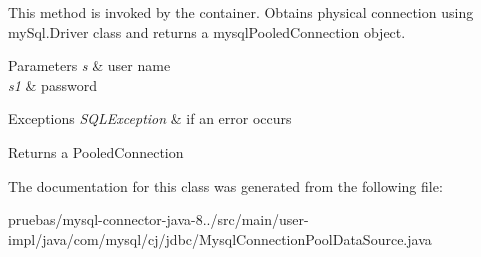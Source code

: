 This method is invoked by the container. Obtains physical connection using my\+Sql.\+Driver class and returns a mysql\+Pooled\+Connection object.


\begin{DoxyParams}{Parameters}
{\em s} & user name \\
\hline
{\em s1} & password \\
\hline
\end{DoxyParams}

\begin{DoxyExceptions}{Exceptions}
{\em S\+Q\+L\+Exception} & if an error occurs \\
\hline
\end{DoxyExceptions}
\begin{DoxyReturn}{Returns}
a Pooled\+Connection 
\end{DoxyReturn}


The documentation for this class was generated from the following file\+:\begin{DoxyCompactItemize}
\item 
pruebas/mysql-\/connector-\/java-\/8../src/main/user-\/impl/java/com/mysql/cj/jdbc/Mysql\+Connection\+Pool\+Data\+Source.\+java\end{DoxyCompactItemize}
